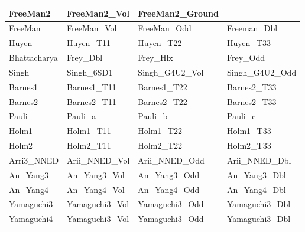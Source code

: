 \documentclass[a4paper,12pt]{spieman}  %
\begin{document}
\begin{spacing}{1}
\begin{table}[h!]
\begin{tabular}{|l|lll|}
FreeMan2\cite{4276884}              & FreeMan2\_Vol       & FreeMan2\_Ground    &                   \\ \hline
FreeMan\cite{673687}                 & FreeMan\_Vol        & FreeMan\_Odd        & Freeman\_Dbl      \\ \hline
Huyen\cite{huynen1990stokes}         & Huyen\_T11          & Huyen\_T22          & Huyen\_T33        \\ \hline
Bhattacharya\cite{bhattacharya2015modifying}              & Frey\_Dbl           & Frey\_Hlx           & Frey\_Odd         \\ \hline
Singh\cite{singh2018model}                                 & Singh\_6SD1         & Singh\_G4U2\_Vol    & Singh\_G4U2\_Odd  \\ \hline
Barnes1\cite{barnes1988roll}          & Barnes1\_T11        & Barnes1\_T22        & Barnes2\_T33      \\ \hline
Barnes2\cite{barnes1988roll}         & Barnes2\_T11        & Barnes2\_T22        & Barnes2\_T33      \\ \hline
Pauli\cite{485127}                                 & Pauli\_a            & Pauli\_b            & Pauli\_c          \\ \hline
Holm1\cite{holm1988radar}           & Holm1\_T11          & Holm1\_T22          & Holm1\_T33        \\ \hline
Holm2\cite{holm1988radar}                                 & Holm2\_T11          & Holm2\_T22          & Holm2\_T33        \\ \hline
Arri3\_NNED\cite{5659970}           & Arii\_NNED\_Vol     & Arii\_NNED\_Odd     & Arii\_NNED\_Dbl   \\ \hline
An\_Yang3\cite{5437202}             & An\_Yang3\_Vol      & An\_Yang3\_Odd      & An\_Yang3\_Dbl    \\ \hline
An\_Yang4\cite{5872006}                             & An\_Yang4\_Vol      & An\_Yang4\_Odd      & An\_Yang4\_Dbl    \\ \hline
Yamaguchi3\cite{yamaguchi2013comparison}                      & Yamaguchi3\_Vol     & Yamaguchi3\_Odd     & Yamaguchi3\_Dbl   \\ \hline
Yamaguchi4\cite{1487628}                            & Yamaguchi3\_Vol     & Yamaguchi3\_Odd     & Yamaguchi3\_Dbl   \\ \hline
\end{tabular}
\label{decomp}
\end{table}
\egroup

\end{spacing}
\end{document}
